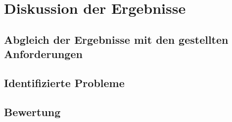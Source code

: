\chapter{Diskussion der Ergebnisse}
\label{ch:discussion}

\section{Abgleich der Ergebnisse mit den gestellten Anforderungen}
\section{Identifizierte Probleme}
\section{Bewertung}
